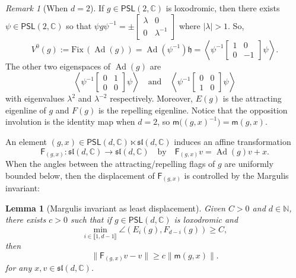\documentclass{amsart}
\theoremstyle{plain}
\newtheorem{lemma}[proposition]{Lemma}
\theoremstyle{definition}
\theoremstyle{remark}
\newtheorem{remark}[proposition]{Remark}
\newcommand{\Ad}{\operatorname{Ad}}
\newcommand{\PSL}{\mathsf{PSL}}
\newcommand{\aff}[1]{\sf{F}_{#1}}
\renewcommand{\sf}[1]{{\mathsf{#1}}}
\newcommand{\lb}{\llbracket}
\newcommand{\rb}{\rrbracket}
\newcommand{\h}{{\mathfrak h}}
\newcommand{\C}{\mathbb C}
\renewcommand{\sl}{\mathfrak{sl}}
\newcommand{\<}{\left <}
\renewcommand{\>}{\right >}
\renewcommand{\C}{\mathbb C}
\begin{document}
\begin{remark}[When $d=2$] If $g\in \PSL(2,\C)$ is loxodromic, then there exists $\psi\in \PSL(2,\C)$ so that
$\psi g\psi^{-1}=\pm\begin{bmatrix} \lambda & 0\\ 0 & \lambda^{-1}\end{bmatrix}$ where $|\lambda|>1$. So,
$$V^0(g):=\mathrm{Fix}\,(\Ad(g))=\Ad(\psi^{-1})\h=\left\langle\psi^{-1}\begin{bmatrix} 1 & 0\\ 0 & {-1}\end{bmatrix}\psi\right\rangle.$$
The other two eigenspaces of $\Ad(g)$ are 
$$\left\langle\psi^{-1}\begin{bmatrix} 0 & 1\\ 0 & 0\end{bmatrix}\psi\right\rangle\quad\text{and}\quad
\left\langle\psi^{-1}\begin{bmatrix} 0 & 0\\ 1 & 0\end{bmatrix}\psi\right\rangle$$
with eigenvalues $\lambda^2$ and $\lambda^{-2}$ respectively. Moreover, $E(g)$ is the attracting eigenline of $g$
and $F(g)$ is the repelling eigenline. Notice that the opposition involution is the identity map when $d=2$, so $\sf m\big((g,x)^{-1}\big)=\sf m(g,x).$
\end{remark}

An element $(g,x)\in\PSL(d,\C)\ltimes\sl(d,\C)$ induces an affine transformation 
$$\aff{(g,x)}:\sl(d,\C)\to\sl(d,\C)\quad\text{by}\quad \aff{(g,x)}v=\Ad(g)v+x.$$
When the angles between the attracting/repelling flags of $g$ are uniformly bounded below, then the displacement of $\aff{(g,x)}$ is controlled by the Margulis invariant:


\begin{lemma}[Margulis invariant as least displacement]
\label{minimo}  Given $C>0$  and $d\in \mathbb N$,  there exists $c>0$ such that if $g\in\PSL(d,\C)$ is loxodromic
and 
$$\min_{i\in\lb1,d-1\rb}\angle(E_i(g),F_{d-i}(g))\ge C,$$
then 
$$\big\|\aff{(g,x)}v-v\big\|\geq c\|\sf m(g,x)\|.$$
for any $x,v\in\sl(d,\C)$.
\end{lemma}
\end{document}
